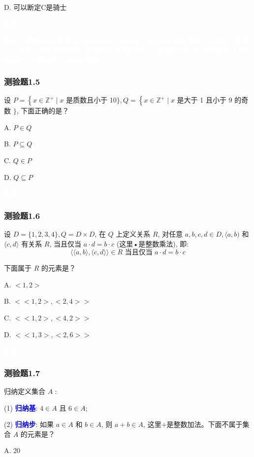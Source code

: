 \documentclass[UTF8, heading=true]{ctexart}
\begin{document}
D. 可以断定C是骑士

\textcolor{white}{答案：D}

\textcolor{white}{解析：假如A是无赖,那么A只会说自己是骑士；如果A是骑士,那么A会说自己是骑士。不管A如何,B说的都一定是假话,即B是无赖。
也就可以推出C说的是真话,即C是骑士。A到底是什么无法判断。}

\subsubsection{测验题1.5}

设 $P=\left\{x \in \mathbb{Z}^{+} \mid x\right.$ 是质数且小于 10$\}, Q=\left\{x \in \mathbb{Z}^{+} \mid x\right.$ 是大于 1 且小于 9 的奇数 $\}$,
下面正确的是？

A. $P \in Q$

B. $P \subseteq Q$

C. $Q \in P$

D. $Q \subseteq P$

\textcolor{white}{答案：D}

\subsubsection{测验题1.6}

设 $D=\{1,2,3,4\}, Q=D \times D$, 在 $Q$ 上定义关系 $R$, 对任意 $a, b, c, d \in D,\langle a, b)$ 和 $\langle c, d\rangle$ 有关系 $R$, 当且仅当 $a \cdot d=b \cdot c$ (这里•是整数乘法), 即:
$$
\langle\langle a, b\rangle,\langle c, d\rangle\rangle \in R \text { 当且仅当 } a \cdot d=b \cdot c
$$

下面属于 $R$ 的元素是？

A. $<1,2>$

B. $<<1,2>,<2,4>>$

C. $<<1,2>,<4,2>>$

D. $<<1,3>,<2,6>>$

\textcolor{white}{答案：B}

\subsubsection{测验题1.7}

归纳定义集合 $A$ :

(1) \textcolor{blue}{\textbf{归纳基}}: $4 \in A$ 且 $6 \in A$;

(2) \textcolor{blue}{\textbf{归纳步}}: 如果 $a \in A$ 和 $b \in A$, 则 $a+b \in A$, 这里$+$是整数加法。下面不属于集合 $A$ 的元素是？

A. 20
\end{document}
